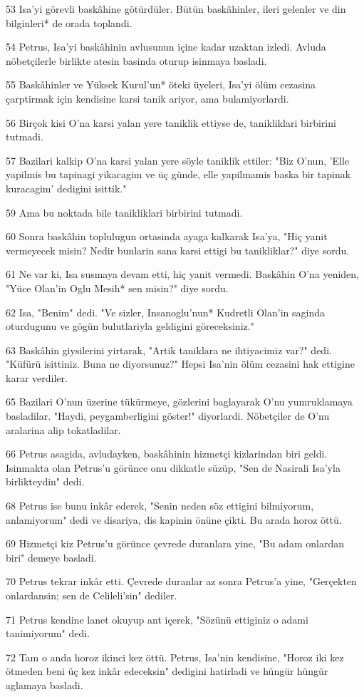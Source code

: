 \par 53 Isa'yi görevli baskâhine götürdüler. Bütün baskâhinler, ileri gelenler ve din bilginleri* de orada toplandi.
\par 54 Petrus, Isa'yi baskâhinin avlusunun içine kadar uzaktan izledi. Avluda nöbetçilerle birlikte atesin basinda oturup isinmaya basladi.
\par 55 Baskâhinler ve Yüksek Kurul'un* öteki üyeleri, Isa'yi ölüm cezasina çarptirmak için kendisine karsi tanik ariyor, ama bulamiyorlardi.
\par 56 Birçok kisi O'na karsi yalan yere taniklik ettiyse de, tanikliklari birbirini tutmadi.
\par 57 Bazilari kalkip O'na karsi yalan yere söyle taniklik ettiler: "Biz O'nun, 'Elle yapilmis bu tapinagi yikacagim ve üç günde, elle yapilmamis baska bir tapinak kuracagim' dedigini isittik."
\par 59 Ama bu noktada bile tanikliklari birbirini tutmadi.
\par 60 Sonra baskâhin toplulugun ortasinda ayaga kalkarak Isa'ya, "Hiç yanit vermeyecek misin? Nedir bunlarin sana karsi ettigi bu tanikliklar?" diye sordu.
\par 61 Ne var ki, Isa susmaya devam etti, hiç yanit vermedi. Baskâhin O'na yeniden, "Yüce Olan'in Oglu Mesih* sen misin?" diye sordu.
\par 62 Isa, "Benim" dedi. "Ve sizler, Insanoglu'nun* Kudretli Olan'in saginda oturdugunu ve gögün bulutlariyla geldigini göreceksiniz."
\par 63 Baskâhin giysilerini yirtarak, "Artik taniklara ne ihtiyacimiz var?" dedi. "Küfürü isittiniz. Buna ne diyorsunuz?" Hepsi Isa'nin ölüm cezasini hak ettigine karar verdiler.
\par 65 Bazilari O'nun üzerine tükürmeye, gözlerini baglayarak O'nu yumruklamaya basladilar. "Haydi, peygamberligini göster!" diyorlardi. Nöbetçiler de O'nu aralarina alip tokatladilar.
\par 66 Petrus asagida, avludayken, baskâhinin hizmetçi kizlarindan biri geldi. Isinmakta olan Petrus'u görünce onu dikkatle süzüp, "Sen de Nasirali Isa'yla birlikteydin" dedi.
\par 68 Petrus ise bunu inkâr ederek, "Senin neden söz ettigini bilmiyorum, anlamiyorum" dedi ve disariya, dis kapinin önüne çikti. Bu arada horoz öttü.
\par 69 Hizmetçi kiz Petrus'u görünce çevrede duranlara yine, "Bu adam onlardan biri" demeye basladi.
\par 70 Petrus tekrar inkâr etti. Çevrede duranlar az sonra Petrus'a yine, "Gerçekten onlardansin; sen de Celileli'sin" dediler.
\par 71 Petrus kendine lanet okuyup ant içerek, "Sözünü ettiginiz o adami tanimiyorum" dedi.
\par 72 Tam o anda horoz ikinci kez öttü. Petrus, Isa'nin kendisine, "Horoz iki kez ötmeden beni üç kez inkâr edeceksin" dedigini hatirladi ve hüngür hüngür aglamaya basladi.


